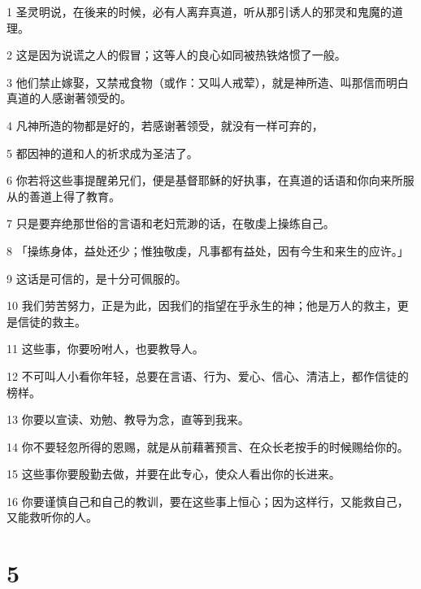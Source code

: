 \par 1 圣灵明说，在後来的时候，必有人离弃真道，听从那引诱人的邪灵和鬼魔的道理。
\par 2 这是因为说谎之人的假冒；这等人的良心如同被热铁烙惯了一般。
\par 3 他们禁止嫁娶，又禁戒食物（或作：又叫人戒荤），就是神所造、叫那信而明白真道的人感谢著领受的。
\par 4 凡神所造的物都是好的，若感谢著领受，就没有一样可弃的，
\par 5 都因神的道和人的祈求成为圣洁了。
\par 6 你若将这些事提醒弟兄们，便是基督耶稣的好执事，在真道的话语和你向来所服从的善道上得了教育。
\par 7 只是要弃绝那世俗的言语和老妇荒渺的话，在敬虔上操练自己。
\par 8 「操练身体，益处还少；惟独敬虔，凡事都有益处，因有今生和来生的应许。」
\par 9 这话是可信的，是十分可佩服的。
\par 10 我们劳苦努力，正是为此，因我们的指望在乎永生的神；他是万人的救主，更是信徒的救主。
\par 11 这些事，你要吩咐人，也要教导人。
\par 12 不可叫人小看你年轻，总要在言语、行为、爱心、信心、清洁上，都作信徒的榜样。
\par 13 你要以宣读、劝勉、教导为念，直等到我来。
\par 14 你不要轻忽所得的恩赐，就是从前藉著预言、在众长老按手的时候赐给你的。
\par 15 这些事你要殷勤去做，并要在此专心，使众人看出你的长进来。
\par 16 你要谨慎自己和自己的教训，要在这些事上恒心；因为这样行，又能救自己，又能救听你的人。

\chapter{5}

